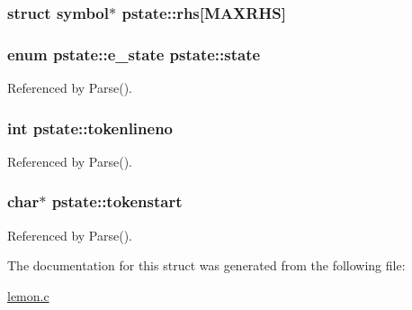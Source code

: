 \hypertarget{structpstate_ae71c3d93c92a602fb759b4f868d5229c}{
\subsubsection[{rhs}]{\setlength{\rightskip}{0pt plus 5cm}struct {\bf symbol}$\ast$ pstate\-::rhs\mbox{[}{\bf M\-A\-X\-R\-H\-S}\mbox{]}}}\label{structpstate_ae71c3d93c92a602fb759b4f868d5229c}
\hypertarget{structpstate_a1524057c2f5cc82fa0e6fc9926ae5fe5}{
\subsubsection[{state}]{\setlength{\rightskip}{0pt plus 5cm}enum {\bf pstate\-::e\-\_\-state}  pstate\-::state}}\label{structpstate_a1524057c2f5cc82fa0e6fc9926ae5fe5}


Referenced by Parse().

\hypertarget{structpstate_acfe7adc67da5621e844fca34dd0889ec}{
\subsubsection[{tokenlineno}]{\setlength{\rightskip}{0pt plus 5cm}int pstate\-::tokenlineno}}\label{structpstate_acfe7adc67da5621e844fca34dd0889ec}


Referenced by Parse().

\hypertarget{structpstate_ab43cf3be5456af13f4b51437e7341751}{
\subsubsection[{tokenstart}]{\setlength{\rightskip}{0pt plus 5cm}char$\ast$ pstate\-::tokenstart}}\label{structpstate_ab43cf3be5456af13f4b51437e7341751}


Referenced by Parse().



The documentation for this struct was generated from the following file\-:\begin{DoxyCompactItemize}
\item 
\hyperlink{lemon_8c}{lemon.\-c}\end{DoxyCompactItemize}

